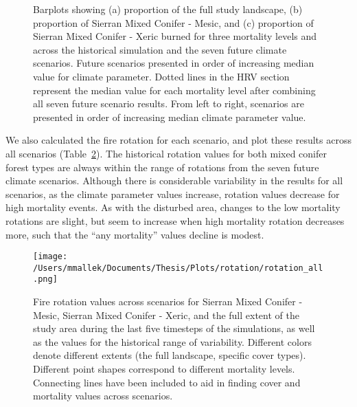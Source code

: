 \documentclass[12pt]{article}
\begin{document}
\begin{spacing}{1}
\begin{figure}[!htbp]

    \caption{Barplots showing (a) proportion of the full study landscape, (b) proportion of Sierran Mixed Conifer - Mesic, and (c) proportion of Sierran Mixed Conifer - Xeric burned for three mortality levels and across the historical simulation and the seven future climate scenarios. Future scenarios presented in order of increasing median value for climate parameter. Dotted lines in the HRV section represent the median value for each mortality level after combining all seven future scenario results. From left to right, scenarios are presented in order of increasing median climate parameter value.}
  \label{fig:dareacomp}
\end{figure}

We also calculated the fire rotation for each scenario, and plot these results across all scenarios (Table~\ref{fig:frotation}). The historical rotation values for both mixed conifer forest types are always within the range of rotations from the seven future climate scenarios. Although there is considerable variability in the results for all scenarios, as the climate parameter values increase, rotation values decrease for high mortality events. As with the disturbed area, changes to the low mortality rotations are slight, but seem to increase when high mortality rotation decreases more, such that the ``any mortality'' values decline is modest. 



\begin{figure}
\centering
\texttt{[image: /Users/mmallek/Documents/Thesis/Plots/rotation/rotation\_all.png]}
\caption{Fire rotation values across scenarios for Sierran Mixed Conifer - Mesic, Sierran Mixed Conifer - Xeric, and the full extent of the study area during the last five timesteps of the simulations, as well as the values for the historical range of variability. Different colors denote different extents (the full landscape, specific cover types). Different point shapes correspond to different mortality levels. Connecting lines have been included to aid in finding cover and mortality values across scenarios.}
\label{fig:frotation}
\end{figure}




\end{spacing}
\end{document}
